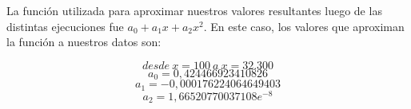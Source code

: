 La función utilizada para aproximar nuestros valores resultantes luego de las distintas ejecuciones fue $a_{0} + a_{1}x + a_{2}x^{2}$.
En este caso, los valores que aproximan la función a nuestros datos son:

$$desde\ x = 100\ a\ x = 32.300$$
$$a_{0}  = 0,424466923410826$$
$$a_{1}  = -0,000176224064649403$$
$$a_{2}  = 1,66520770037108e^{-8}$$




